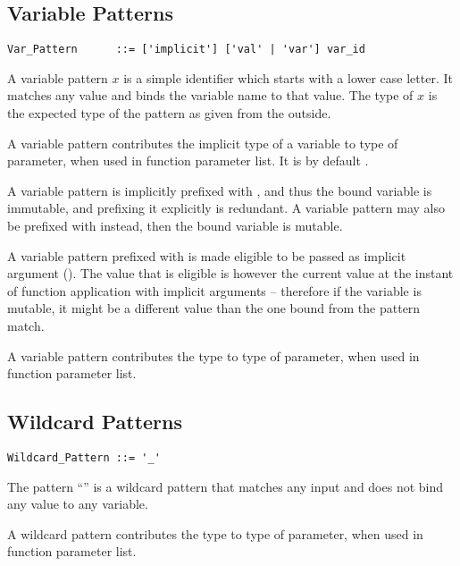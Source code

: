 \subsection{Variable Patterns}
\label{sec:variable-patterns}

\syntax\begin{lstlisting}
Var_Pattern      ::= ['implicit'] ['val' | 'var'] var_id
\end{lstlisting}

A variable pattern $x$ is a simple identifier which starts with a lower case letter. It matches any value and binds the variable name to that value. The type of $x$ is the expected type of the pattern as given from the outside. 

A variable pattern contributes the implicit type of a variable to type of parameter, when used in function parameter list. It is by default . 

A variable pattern is implicitly prefixed with , and thus the bound variable is immutable, and prefixing it explicitly is redundant. A variable pattern may also be prefixed with  instead, then the bound variable is mutable. 

A variable pattern prefixed with  is made eligible to be passed as implicit argument (). The value that is eligible is however the current value at the instant of function application with implicit arguments -- therefore if the variable is mutable, it might be a different value than the one bound from the pattern match. 

A variable pattern contributes the type  to type of parameter, when used in function parameter list. 






\subsection{Wildcard Patterns}
\label{sec:wildcard-patterns}

\syntax\begin{lstlisting}
Wildcard_Pattern ::= '_'
\end{lstlisting}

The pattern ``\code{_}'' is a wildcard pattern that matches any input and does not bind any value to any variable. 

A wildcard pattern contributes the type  to type of parameter, when used in function parameter list. 

